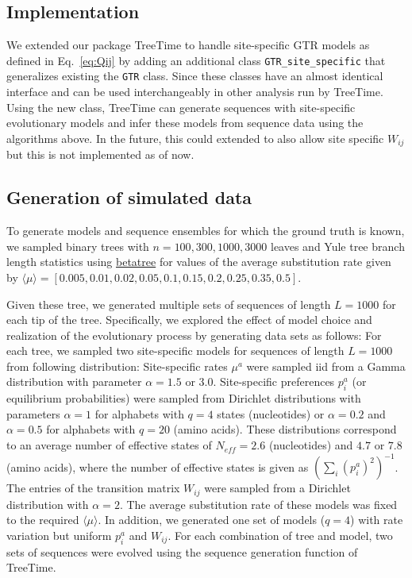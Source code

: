 \documentclass[aps,rmp,twocolumn,linenumbers]{revtex4-1}
\newcommand{\eqp}{p}
\begin{document}
\subsection*{Implementation}
We extended our package TreeTime \citep{sagulenko2017treetime} to handle site-specific GTR models as defined in Eq.~\ref{eq:Qij} by adding an additional class \texttt{GTR\_site\_specific} that generalizes existing the \texttt{GTR} class.
Since these classes have an almost identical interface and can be used interchangeably in other analysis run by TreeTime.
Using the new class, TreeTime can generate sequences with site-specific evolutionary models and infer these models from sequence data using the algorithms above.
In the future, this could extended to also allow site specific $W_{ij}$ but this is not implemented as of now.


\subsection*{Generation of simulated data}
\label{sec:MM_simulated}
To generate models and sequence ensembles for which the ground truth is known, we sampled binary trees with $n=100, 300, 1000, 3000$ leaves and Yule tree branch length statistics using \href{https://github.com/neherlab/betatree}{betatree} \citep{neher2013coalescence} for values of the average substitution rate given by $\langle \mu\rangle = [0.005, 0.01, 0.02, 0.05, 0.1, 0.15, 0.2, 0.25, 0.35, 0.5]$.

Given these tree, we generated multiple sets of sequences of length $L=1000$ for each tip of the tree.
Specifically, we explored the effect of model choice and realization of the evolutionary process by generating data sets as follows:
For each tree, we sampled two site-specific models for sequences of length $L=1000$ from following distribution:
Site-specific rates $\mu^a$ were sampled iid from a Gamma distribution with parameter $\alpha=1.5$ or $3.0$.
Site-specific preferences $\eqp_i^a$ (or equilibrium probabilities) were sampled from Dirichlet distributions with parameters $\alpha=1$ for alphabets with $q=4$ states (nucleotides) or $\alpha=0.2$ and $\alpha=0.5$ for alphabets with $q=20$ (amino acids).
These distributions correspond to an average number of effective states of $N_{eff} = 2.6$ (nucleotides) and $4.7$ or $7.8$ (amino acids), where the number of effective states is given as $\left(\sum_i (\eqp_i^a)^2\right)^{-1}$.
The entries of the transition matrix $W_{ij}$ were sampled from a Dirichlet distribution with $\alpha=2$.
The average substitution rate of these models was fixed to the required $\langle \mu\rangle$.
In addition, we generated one set of models ($q=4$) with rate variation but uniform $\eqp_i^a$ and $W_{ij}$.
For each combination of tree and model, two sets of sequences were evolved using the sequence generation function of TreeTime.
\end{document}
